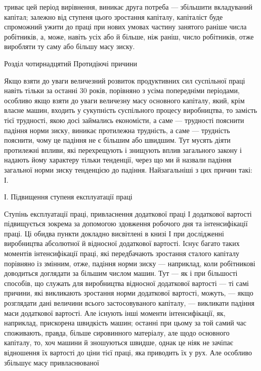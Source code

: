 \parcont{}  %
триває цей період вирівнення, виникає друга потреба — збільшити вкладуваний капітал; залежно від
ступеня цього зростання капіталу, капіталіст буде спроможний ужити до праці при нових умовах частину
занятого раніше числа робітників, а, може, навіть усіх або й більше, ніж раніш, число робітників,
отже виробляти ту саму або більшу масу зиску.

Розділ чотирнадцятий
Протидіючі причини

Якщо взяти до уваги величезний розвиток продуктивних сил суспільної праці навіть тільки за останні
30 років, порівняно з усіма попередніми періодами, особливо якщо взяти до уваги величезну масу
основного капіталу, який, крім власне машин, входить у сукупність суспільного процесу виробництва,
то замість тієї трудності, якою досі займались економісти, а саме — трудності пояснити падіння норми
зиску, виникає протилежна трудність, а саме — трудність пояснити, чому це падіння не є більшим або
швидшим. Тут мусять діяти протилежні впливи, які перехрещують і знищують вплив загального закону і
надають йому характеру тільки тенденції, через що ми й назвали
падіння загальної норми зиску тенденцією до падіння. Найзагальніші з цих причин такі: І.

І. Підвищення ступеня експлуатації праці

Ступінь експлуатації праці, привласнення додаткової праці І додаткової вартості підвищується зокрема
за допомогою здовження робочого дня та інтенсифікації праці. Ці обидва пункти докладно висвітлені в
книзі І при дослідженні виробництва абсолютної й відносної додаткової вартості. Існує багато таких
моментів інтенсифікації праці, які передбачають зростання сталого капіталу порівняно із змінним,
отже, падіння норми зиску — наприклад, коли робітникові доводиться доглядати за більшим числом
машин. Тут — як і при більшості способів, що служать для виробництва відносної додаткової вартості —
ті самі причини, які викликають зростання норми додаткової вартості, можуть, — якщо розглядати дані
величини всього застосовуваного капіталу, — викликати падіння маси додаткової вартості. Але існують
інші моменти інтенсифікації, як, наприклад, прискорена швидкість машин; останні при цьому за той
самий час споживають, правда, більше сировинного матеріалу, але щодо основного капіталу, то, хоч
машини й зношуються швидше, однак це ніяк не зачіпає відношення їх вартості до ціни тієї праці, яка
приводить їх у рух. Але особливо збільшує масу привласнюваної
\parbreak{}  %
